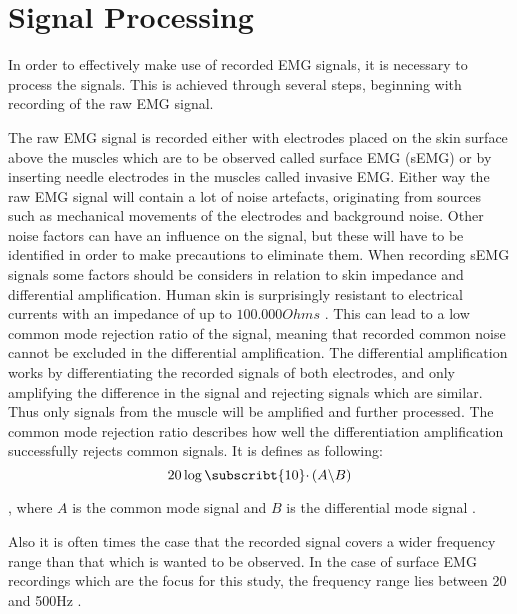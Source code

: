 \section{Signal Processing}

In order to effectively make use of recorded EMG signals, it is necessary to process the signals. This is achieved through several steps, beginning with recording of the raw EMG signal.
 
The raw EMG signal is recorded either with electrodes placed on the skin surface above the muscles which are to be observed called surface EMG (sEMG) or by inserting needle electrodes in the muscles called invasive EMG. Either way the raw EMG signal will contain a lot of noise artefacts, originating from sources such as mechanical movements of the electrodes and background noise. Other noise factors can have an influence on the signal, but these will have to be identified in order to make precautions to eliminate them. 
When recording sEMG signals some factors should be considers in relation to skin impedance and differential amplification. Human skin is surprisingly resistant to electrical currents with an impedance of up to $100.000 Ohms$ \cite{fish2009}. This can lead to a low common mode rejection ratio of the signal, meaning that recorded common noise cannot be excluded in the differential amplification. The differential amplification works by differentiating the recorded signals of both electrodes, and only amplifying the difference in the signal and rejecting signals which are similar. Thus only signals from the muscle will be amplified and further processed. The common mode rejection ratio describes how well the differentiation amplification successfully rejects common signals.\cite{cram2012} 
It is defines as following:
\begin{equation}
20 \log \subscribt{10} \cdotp (A \backslash B)
\end{equation}

, where $A$ is the common mode signal and $B$ is the differential mode signal \cite{cram2012}.

Also it is often times the case that the recorded signal covers a wider frequency range than that which is wanted to be observed. In the case of surface EMG recordings which are the focus for this study, the frequency range lies between 20 and 500Hz \cite{cram2012}.






